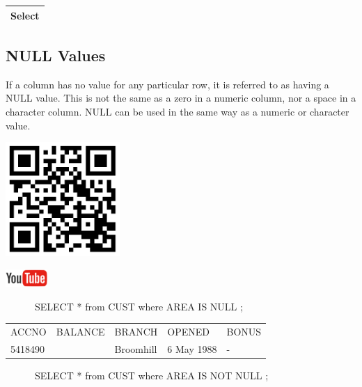 \begin{flushleft}
\tablefirsthead{}
\tablehead{}
\tabletail{}
\tablelasttail{}
\begin{supertabular}{|m{14.583cm}|}
\hline
Select

\\\hline
\end{supertabular}
\end{flushleft}
\subsection{NULL Values}
If a column has no value for any particular row, it is referred to as having a NULL value. This is not the same as a zero in a numeric column, nor a space in a character column.  NULL can be used in the same way as a numeric or character value.



\begin{center}
\begin{minipage}{4.849cm}
   
\includegraphics[width=4.341cm,height=4.341cm]{images/img (32).png}
 

   
\includegraphics[width=1.582cm,height=0.674cm]{images/img (15).png}
 
\end{minipage}
\end{center}
\ \ \ \ \ \ SELECT * from CUST where AREA IS NULL ;

\begin{flushleft}
\tablefirsthead{}
\tablehead{}
\tabletail{}
\tablelasttail{}
\begin{supertabular}{|m{1.9909999cm}|m{2.3009999cm}|m{2.0509999cm}|m{2.55cm}|m{1.8cm}|}
\hline
ACCNO &
BALANCE

 &
BRANCH &
OPENED &
BONUS\\
5418490 &
 &
Broomhill &
6 May 1988 &
\centering\arraybslash {}-\\\hline
\end{supertabular}
\end{flushleft}
\ \ \ \ \ \ SELECT * from CUST where AREA IS NOT NULL ;

